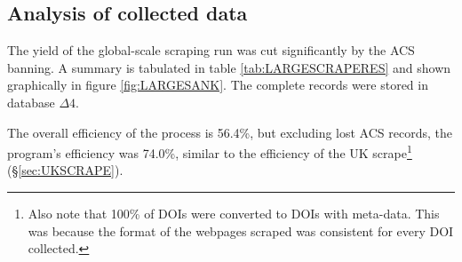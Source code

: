 \subsection{Analysis of collected data}
The yield of the global-scale scraping run was cut significantly by the ACS banning. A summary is tabulated in table \ref{tab:LARGESCRAPERES} and shown graphically in figure \ref{fig:LARGESANK}. The complete records were stored in database $\Delta4$.
%

The overall efficiency of the process is 56.4\%, but excluding lost ACS records, the program's efficiency was 74.0\%, similar to the efficiency of the UK scrape\footnote{Also note that 100\% of DOIs were converted to DOIs with meta-data. This was because the format of the webpages scraped was consistent for every DOI collected.} (\S\ref{sec:UKSCRAPE}).

